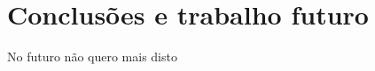 \documentclass{llncs}
\begin{document}
\newpage

\section{Conclusões e trabalho futuro}

No futuro não quero mais disto

\newpage
%

\begin{thebibliography}{1}





\end{thebibliography}
\end{document}
